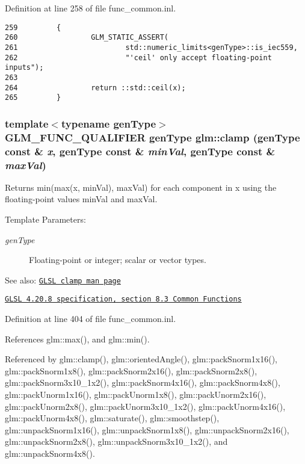 Definition at line 258 of file func\_\-common.inl.

\begin{Code}\begin{verbatim}259         {
260                 GLM_STATIC_ASSERT(
261                         std::numeric_limits<genType>::is_iec559,
262                         "'ceil' only accept floating-point inputs");
263 
264                 return ::std::ceil(x);
265         }
\end{verbatim}
\end{Code}


\hypertarget{group__core__func__common_g8b4808983e20c4c74b20e0a025787ab4}{
\subsubsection[clamp]{\setlength{\rightskip}{0pt plus 5cm}template$<$typename genType$>$ GLM\_\-FUNC\_\-QUALIFIER genType glm::clamp (genType const \& {\em x}, \/  genType const \& {\em minVal}, \/  genType const \& {\em maxVal})}}
\label{group__core__func__common_g8b4808983e20c4c74b20e0a025787ab4}


Returns min(max(x, minVal), maxVal) for each component in x using the floating-point values minVal and maxVal.

\begin{Desc}
\item[Template Parameters:]
\begin{description}
\item[{\em genType}]Floating-point or integer; scalar or vector types.\end{description}
\end{Desc}
\begin{Desc}
\item[See also:]\href{http://www.opengl.org/sdk/docs/manglsl/xhtml/clamp.xml}{\tt GLSL clamp man page} 

\href{http://www.opengl.org/registry/doc/GLSLangSpec.4.20.8.pdf}{\tt GLSL 4.20.8 specification, section 8.3 Common Functions} \end{Desc}


Definition at line 404 of file func\_\-common.inl.

References glm::max(), and glm::min().

Referenced by glm::clamp(), glm::orientedAngle(), glm::packSnorm1x16(), glm::packSnorm1x8(), glm::packSnorm2x16(), glm::packSnorm2x8(), glm::packSnorm3x10\_\-1x2(), glm::packSnorm4x16(), glm::packSnorm4x8(), glm::packUnorm1x16(), glm::packUnorm1x8(), glm::packUnorm2x16(), glm::packUnorm2x8(), glm::packUnorm3x10\_\-1x2(), glm::packUnorm4x16(), glm::packUnorm4x8(), glm::saturate(), glm::smoothstep(), glm::unpackSnorm1x16(), glm::unpackSnorm1x8(), glm::unpackSnorm2x16(), glm::unpackSnorm2x8(), glm::unpackSnorm3x10\_\-1x2(), and glm::unpackSnorm4x8().

